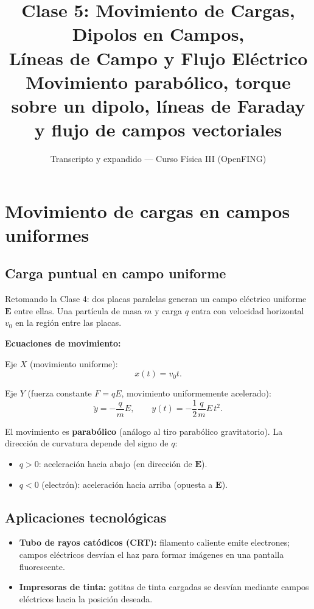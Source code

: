 \documentclass[12pt,a4paper]{article}
\title{\textbf{Clase 5: Movimiento de Cargas, Dipolos en Campos, \\
        Líneas de Campo y Flujo Eléctrico}\\[0.3em]
        \large{Movimiento parabólico, torque sobre un dipolo,
              líneas de Faraday y flujo de campos vectoriales}}
\author{Transcripto y expandido --- Curso Física III (OpenFING)}
\date{}
\begin{document}
\maketitle
\thispagestyle{empty}
\newpage

\tableofcontents
\newpage

\section{Movimiento de cargas en campos uniformes}

\subsection{Carga puntual en campo uniforme}

Retomando la Clase 4: dos placas paralelas generan un campo eléctrico
uniforme $\mathbf{E}$ entre ellas. Una partícula de masa $m$ y carga
$q$ entra con velocidad horizontal $v_0$ en la región entre las placas.

\textbf{Ecuaciones de movimiento:}

Eje $X$ (movimiento uniforme):
\[
x(t) = v_0 t .
\]

Eje $Y$ (fuerza constante $F = qE$, movimiento uniformemente
acelerado):
\[
\ddot{y} = -\frac{q}{m} E,
\qquad
y(t) = -\frac{1}{2}\frac{q}{m} E \, t^{2}.
\]

\begin{keybox}
  El movimiento es \textbf{parabólico} (análogo al tiro parabólico
  gravitatorio). La dirección de curvatura depende del signo de $q$:
  \begin{itemize}[nosep]
    \item $q > 0$: aceleración hacia abajo (en dirección de
          $\mathbf{E}$).
    \item $q < 0$ (electrón): aceleración hacia arriba (opuesta a
          $\mathbf{E}$).
  \end{itemize}
\end{keybox}

\subsection{Aplicaciones tecnológicas}

\begin{itemize}[nosep]
  \item \textbf{Tubo de rayos catódicos (CRT):} filamento caliente
        emite electrones; campos eléctricos desvían el haz para formar
        imágenes en una pantalla fluorescente.
  \item \textbf{Impresoras de tinta:} gotitas de tinta cargadas se
        desvían mediante campos eléctricos hacia la posición deseada.
\end{itemize}
\end{document}
